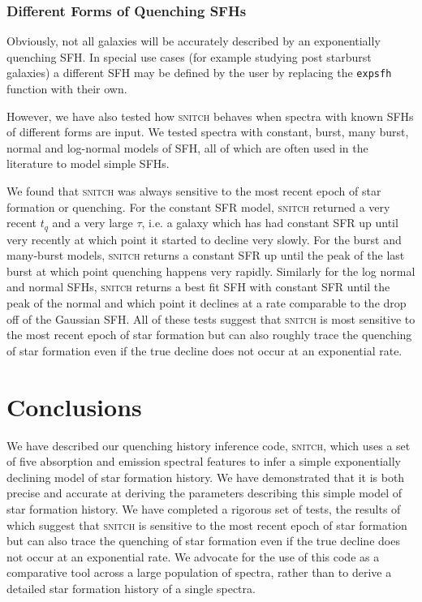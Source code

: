 \documentclass[useAMS,usenatbib]{mn2e}
\begin{document}
\subsubsection{Different Forms of Quenching SFHs}

Obviously, not all galaxies will be accurately described by an exponentially quenching SFH. In special use cases (for example studying post starburst galaxies) a different SFH may be defined by the user by replacing the \texttt{expsfh} function with their own. 

However, we have also tested how \textsc{snitch} behaves when spectra with known SFHs of different forms are input. We tested spectra with  constant, burst, many burst, normal and log-normal models of SFH, all of which are often used in the literature to model simple SFHs. 

We found that \textsc{snitch} was always sensitive to the most recent epoch of star formation or quenching. For the constant SFR model, \textsc{snitch} returned a very recent $t_q$ and a very large $\tau$, i.e. a galaxy which has had constant SFR up until very recently at which point it started to decline very slowly. For the burst and many-burst models, \textsc{snitch} returns a constant SFR up until the peak of the last burst at which point quenching happens very rapidly. Similarly for the log normal and normal SFHs, \textsc{snitch} returns a best fit SFH with constant SFR until the peak of the normal and which point it declines at a rate comparable to the drop off of the Gaussian SFH. All of these tests suggest that \textsc{snitch} is most sensitive to the most recent epoch of star formation but can also roughly trace the quenching of star formation even if the true decline does not occur at an exponential rate. 



\section{Conclusions}

We have described our quenching history inference code, \textsc{snitch}, which uses a set of five absorption and emission spectral features to infer a simple exponentially declining model of star formation history. We have demonstrated that it is both precise and accurate at deriving the parameters describing this simple model of star formation history. We have completed a rigorous set of tests, the results of which suggest that \textsc{snitch} is sensitive to the most recent epoch of star formation but can also trace the quenching of star formation even if the true decline does not occur at an exponential rate.  We advocate for the use of this code as a comparative tool across a large population of spectra, rather than to derive a detailed star formation history of a single spectra. 
\end{document}
